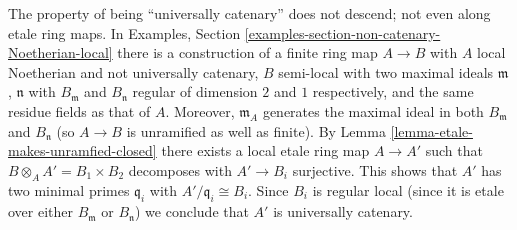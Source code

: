 \begin{remark}
\label{remark-universally-catenary-does-not-descend}
The property of being ``universally catenary'' does not descend;
not even along etale ring maps. In
Examples, Section \ref{examples-section-non-catenary-Noetherian-local}
there is a construction of a finite ring map $A \to B$ with
$A$ local Noetherian and not universally catenary,
$B$ semi-local with two maximal ideals $\mathfrak m$, $\mathfrak n$
with $B_{\mathfrak m}$ and $B_{\mathfrak n}$ regular of dimension $2$ and $1$
respectively, and the same residue fields as that of $A$.
Moreover, $\mathfrak m_A$ generates the maximal ideal in both
$B_{\mathfrak m}$ and $B_{\mathfrak n}$ (so $A \to B$ is unramified
as well as finite).
By Lemma \ref{lemma-etale-makes-unramfied-closed}
there exists a local etale ring map
$A \to A'$ such that $B \otimes_A A' = B_1 \times B_2$ decomposes
with $A' \to B_i$ surjective.
This shows that $A'$ has two minimal primes $\mathfrak q_i$
with $A'/\mathfrak q_i \cong B_i$. Since $B_i$ is regular local
(since it is etale over either $B_{\mathfrak m}$ or $B_{\mathfrak n}$)
we conclude that $A'$ is universally catenary.
\end{remark}


















